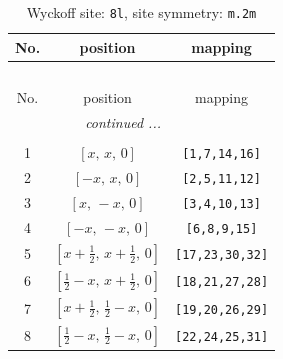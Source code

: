 \documentclass[fleqn,8pt]{jsarticle}
\begin{document}
\begin{longtable}{ccc}
\caption{Wyckoff site: {\tt 8l}, site symmetry: {\tt m.2m}}
 \\
 \hline \hline
No. & position & mapping \\ \hline \endfirsthead

\multicolumn{2}{l}{\tablename\ \thetable{}} \\
 \hline \hline
No. & position & mapping \\ \hline \endhead

 \hline \hline
\multicolumn{2}{r}{\footnotesize\it continued ...} \\ \endfoot

 \hline \hline
\multicolumn{2}{r}{} \\ \endlastfoot

1 & $\left[ x,\, x,\, 0 \right]$ & {\tt [1,7,14,16]} \\ \hline
2 & $\left[ - x,\, x,\, 0 \right]$ & {\tt [2,5,11,12]} \\ \hline
3 & $\left[ x,\, - x,\, 0 \right]$ & {\tt [3,4,10,13]} \\ \hline
4 & $\left[ - x,\, - x,\, 0 \right]$ & {\tt [6,8,9,15]} \\ \hline
5 & $\left[ x + \frac{1}{2},\, x + \frac{1}{2},\, 0 \right]$ & {\tt [17,23,30,32]} \\ \hline
6 & $\left[ \frac{1}{2} - x,\, x + \frac{1}{2},\, 0 \right]$ & {\tt [18,21,27,28]} \\ \hline
7 & $\left[ x + \frac{1}{2},\, \frac{1}{2} - x,\, 0 \right]$ & {\tt [19,20,26,29]} \\ \hline
8 & $\left[ \frac{1}{2} - x,\, \frac{1}{2} - x,\, 0 \right]$ & {\tt [22,24,25,31]} \\
\end{longtable}
\renewcommand{\arraystretch}{1.2}
\end{document}
